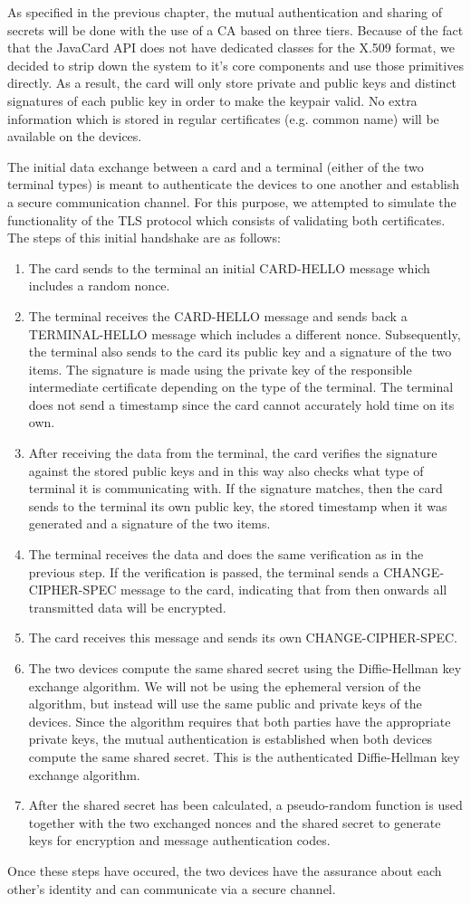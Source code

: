 As specified in the previous chapter, the mutual authentication and sharing of secrets will be done with the use of a CA based on three tiers. Because of the fact that the JavaCard API does not have dedicated classes for the X.509 format, we decided to strip down the system to it's core components and use those primitives directly. As a result, the card will only store private and public keys and distinct signatures of each public key in order to make the keypair valid. No extra information which is stored in regular certificates (e.g. common name) will be available on the devices.

The initial data exchange between a card and a terminal (either of the two terminal types) is meant to authenticate the devices to one another and establish a secure communication channel. For this purpose, we attempted to simulate the functionality of the TLS protocol which consists of validating both certificates. The steps of this initial handshake are as follows:
\begin{enumerate}
 \item The card sends to the terminal an initial CARD-HELLO message which includes a random nonce.
 \item The terminal receives the CARD-HELLO message and sends back a TERMINAL-HELLO message which includes a different nonce. Subsequently, the terminal also sends to the card its public key and a signature of the two items. The signature is made using the private key of the responsible intermediate certificate depending on the type of the terminal. The terminal does not send a timestamp since the card cannot accurately hold time on its own.
 \item After receiving the data from the terminal, the card verifies the signature against the stored public keys and in this way also checks what type of terminal it is communicating with. If the signature matches, then the card sends to the terminal its own public key, the stored timestamp when it was generated and a signature of the two items.
 \item The terminal receives the data and does the same verification as in the previous step. If the verification is passed, the terminal sends a CHANGE-CIPHER-SPEC message to the card, indicating that from then onwards all transmitted data will be encrypted.
 \item The card receives this message and sends its own CHANGE-CIPHER-SPEC.
 \item The two devices compute the same shared secret using the Diffie-Hellman key exchange algorithm. We will not be using the ephemeral version of the algorithm, but instead will use the same public and private keys of the devices. Since the algorithm requires that both parties have the appropriate private keys, the mutual authentication is established when both devices compute the same shared secret. This is the authenticated Diffie-Hellman key exchange algorithm.
 \item After the shared secret has been calculated, a pseudo-random function is used together with the two exchanged nonces and the shared secret to generate keys for encryption and message authentication codes.
\end{enumerate}

Once these steps have occured, the two devices have the assurance about each other's identity and can communicate via a secure channel.
